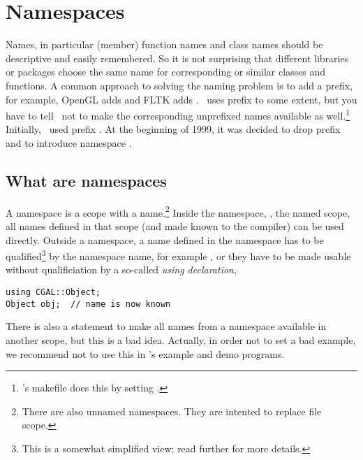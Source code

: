 
\chapter{Namespaces}
\label{chap:namespaces}

Names, in particular (member) function names and class names should 
be descriptive and easily remembered. So it is not surprising that
different libraries or packages choose the same name for corresponding
or similar classes and functions. A common approach to solving the
naming problem is to add a prefix, for example, 
OpenGL adds 
and FLTK adds . \leda\ uses prefix %
to some extent, 
but you have to tell \leda\ not to make the corresponding unprefixed names 
available as well.\footnote{\cgal's
makefile does this by setting .} Initially, \cgal\ used
prefix . 
At the beginning of 1999, it was decided to drop prefix  and to 
introduce namespace . 

\section{What are namespaces}
A namespace
is a scope with a name.\footnote{There are also unnamed namespaces.
They are intented to replace file scope.} Inside the namespace, \ie, the
named scope, all names defined in that scope (and made known to the compiler) 
can be used directly. Outside a namespace, a name defined in the namespace
has to be qualified\footnote{This is a somewhat simplified view; read further
for more details.} by the namespace name, for example ,%
or they have to be made usable without qualificiation by a so-called 
{\em using declaration},
\begin{verbatim}
using CGAL::Object;
Object obj;  // name is now known
\end{verbatim}
There is also a statement to make all names from a namespace available in
another scope, but this is a bad idea. Actually, in order not to set a bad
example, we recommend not to use this in \cgal's example and demo programs.

